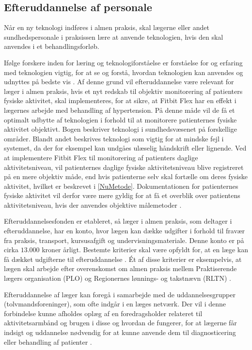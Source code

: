 \subsection{Efteruddannelse af personale}
\label{sec:efteruddannelse}
Når en ny teknologi indføres i almen praksis, skal lægerne eller andet sundhedspersonale i praksissen lære at anvende teknologien, hvis den skal anvendes i et behandlingsforløb.
 
Ifølge forskere inden for læring og teknologiforståelse er forståelse for og erfaring med teknologien vigtig, for at se og forstå, hvordan teknologien kan anvendes og udnyttes på bedste vis \citep{aarhusuniversitet2013}. 
Af denne grund vil efteruddannelse være relevant for læger i almen praksis, hvis et nyt redskab til objektiv monitorering af patienters fysiske aktivitet, skal implementeres, for at sikre, at Fitbit Flex har en effekt i lægernes arbejde med behandling af hypertension. På denne måde vil de få et optimalt udbytte af teknologien i forhold til at monitorere patienternes fysiske aktivitet objektivt. Bogen  beskriver teknologi i sundhedsvæsenet på forskellige områder. Blandt andet beskrives teknologi som vigtig for at mindske fejl i systemet, da der for eksempel kan undgåes ulæselig håndskrift eller lignende. Ved at implementere Fitbit Flex til monitorering af patienters daglige aktivitetsniveau, vil patienternes daglige fysiske aktivitetsniveau blive registreret på en mere objektiv måde, end hvis patienterne selv skal fortælle om deres fysiske aktivitet, hvilket er beskrevet i \autoref{NuMetode}. Dokumentationen for patienternes fysiske aktivitet vil derfor være mere gyldig for at få et overblik over patientens aktivitetsniveau, hvis der anvendes objektive målemetoder \citep{hasse2012}. 

Efteruddannelsesfonden er etableret, så læger i almen praksis, som deltager i efteruddannelse, har en konto, hvor lægen kan dække udgifter i forhold til fravær fra praksis, transport, kursusafgift og undervisningsmateriale. Denne konto er på cirka $13.000$ kroner årligt. Bestemte kriterier skal være opfyldt for, at en læge kan få dækket udgifterne til efteruddannelse \citep{vedsted2005}. Ét af disse kriterier er eksempelvis, at lægen skal arbejde efter overenskomst om almen praksis mellem Praktiserende lægers organisation (PLO) og Regionernes lønnings- og takstnævn (RLTN) \citep{fondenforalmenpraksis2016}. 

Efteruddannelse af læger kan foregå i samarbejde med de uddannelsesgrupper (tolvmandsforeninger), som ofte indgår i en læges netværk. Der vil i denne forbindelse kunne afholdes oplæg af en foredragsholder relateret til aktivitetsarmbånd og brugen i disse og hvordan de fungerer, for at lægerne får indsigt og uddannelse nødvendig for at kunne anvende dem til diagnosticering eller behandling af patienter \citep{vedsted2005}. 

